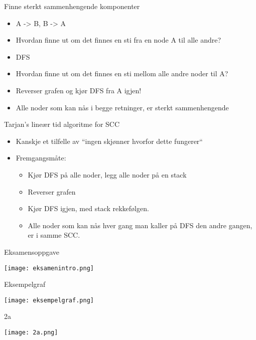 \documentclass[norsk, handout]{beamer}
\begin{document}
	\begin{frame}{Finne sterkt sammenhengende komponenter}
		\begin{itemize}
			\item A -> B, B -> A
			\item Hvordan finne ut om det finnes en sti fra en node A til alle andre?
				\pause
			\item DFS
			\item Hvordan finne ut om det finnes en sti mellom alle andre noder til A?
				\pause
			\item Reverser grafen og kjør DFS fra A igjen!
			\item Alle noder som kan nås i begge retninger, er sterkt sammenhengende
		\end{itemize}
	\end{frame}

	\begin{frame}{Tarjan's lineær tid algoritme for SCC}
	\begin{itemize}
		\item Kanskje et tilfelle av ``ingen skjønner hvorfor dette fungerer``
		\item Fremgangsmåte:
			\begin{itemize}
				\item Kjør DFS på alle noder, legg alle noder på en stack
				\item Reverser grafen
				\item Kjør DFS igjen, med stack rekkefølgen.
				\item Alle noder som kan nås hver gang man kaller på DFS den andre gangen, er i samme SCC.
			\end{itemize}
	\end{itemize}
	\end{frame}

	\begin{frame}{Eksamensoppgave}
		\begin{center}
			\texttt{[image: eksamenintro.png]}
		\end{center}
	\end{frame}

	\begin{frame}{Eksempelgraf}
		\begin{center}
			\texttt{[image: eksempelgraf.png]}
		\end{center}
	\end{frame}

	\begin{frame}{2a}
		\begin{center}
			\texttt{[image: 2a.png]}
		\end{center}
	\end{frame}
\end{document}
